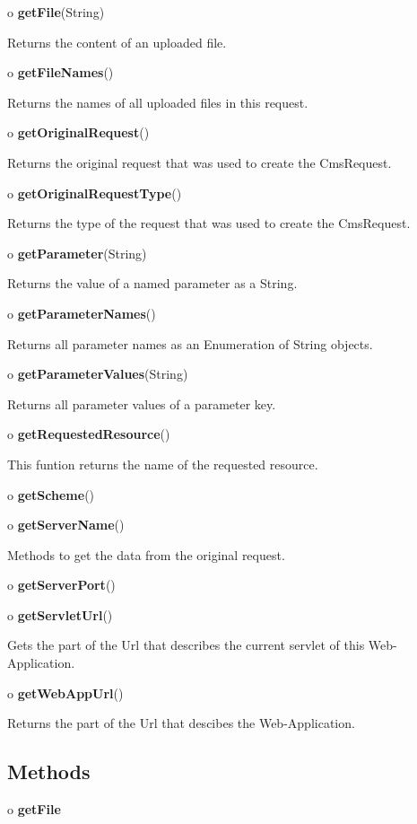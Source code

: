 \begin{description}
\item o {\bf getFile}(String)  

Returns the content of an uploaded file.  
\item o {\bf getFileNames}()  

Returns the names of all uploaded files in this request.  
\item o {\bf getOriginalRequest}()  

Returns the original request that was used to create the CmsRequest.  
\item o {\bf getOriginalRequestType}()  

Returns the type of the request that was used to create the CmsRequest.  
\item o {\bf getParameter}(String)  

Returns the value of a named parameter as a String.  
\item o {\bf getParameterNames}()  

Returns all parameter names as an Enumeration of String objects.  
\item o {\bf getParameterValues}(String)  

Returns all parameter values of a parameter key.  
\item o {\bf getRequestedResource}()  

This funtion returns the name of the requested resource.  
\item o {\bf getScheme}()  

\item o {\bf getServerName}()  

Methods to get the data from the original request.  
\item o {\bf getServerPort}()  

\item o {\bf getServletUrl}()  

Gets the part of the Url that describes the current servlet of this
Web-Application.  
\item o {\bf getWebAppUrl}()  

Returns the part of the Url that descibes the Web-Application. 
\end{description}

\subsection*{  Methods }

o {\bf getFile} 

